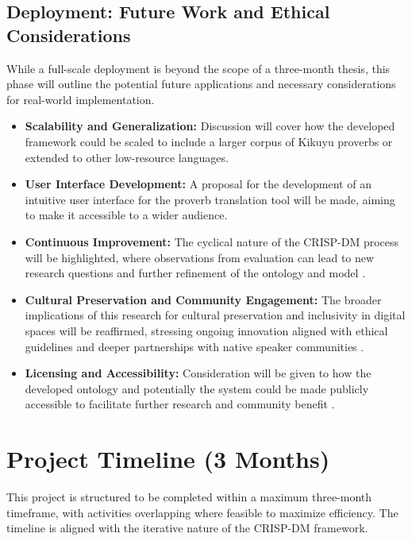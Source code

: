 \documentclass[12pt]{article}
\let\cite\textcite  %
\begin{document}
\subsection{Deployment: Future Work and Ethical Considerations}

While a full-scale deployment is beyond the scope of a three-month thesis, this phase will outline the potential future applications and necessary considerations for real-world implementation.

\begin{itemize}
\item \textbf{Scalability and Generalization:} Discussion will cover how the developed framework could be scaled to include a larger corpus of Kikuyu proverbs or extended to other low-resource languages.

\item \textbf{User Interface Development:} A proposal for the development of an intuitive user interface for the proverb translation tool will be made, aiming to make it accessible to a wider audience.

\item \textbf{Continuous Improvement:} The cyclical nature of the CRISP-DM process will be highlighted, where observations from evaluation can lead to new research questions and further refinement of the ontology and model \cite{crisp2023dm}.

\item \textbf{Cultural Preservation and Community Engagement:} The broader implications of this research for cultural preservation and inclusivity in digital spaces will be reaffirmed, stressing ongoing innovation aligned with ethical guidelines and deeper partnerships with native speaker communities \cite{li2024rag}.

\item \textbf{Licensing and Accessibility:} Consideration will be given to how the developed ontology and potentially the system could be made publicly accessible to facilitate further research and community benefit \cite{unesco2023digital}.
\end{itemize}

\section{Project Timeline (3 Months)}

This project is structured to be completed within a maximum three-month timeframe, with activities overlapping where feasible to maximize efficiency. The timeline is aligned with the iterative nature of the CRISP-DM framework.
\end{document}
